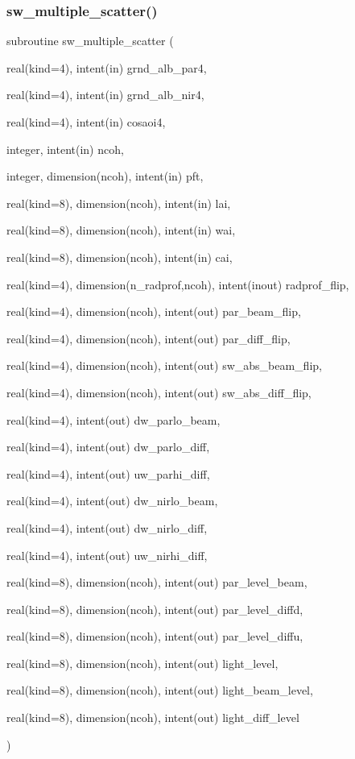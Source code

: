 \subsubsection{\texorpdfstring{sw\+\_\+multiple\+\_\+scatter()}{sw\_multiple\_scatter()}}
{\footnotesize\ttfamily subroutine sw\+\_\+multiple\+\_\+scatter (\begin{DoxyParamCaption}\item[{real(kind=4), intent(in)}]{grnd\+\_\+alb\+\_\+par4,  }\item[{real(kind=4), intent(in)}]{grnd\+\_\+alb\+\_\+nir4,  }\item[{real(kind=4), intent(in)}]{cosaoi4,  }\item[{integer, intent(in)}]{ncoh,  }\item[{integer, dimension(ncoh), intent(in)}]{pft,  }\item[{real(kind=8), dimension(ncoh), intent(in)}]{lai,  }\item[{real(kind=8), dimension(ncoh), intent(in)}]{wai,  }\item[{real(kind=8), dimension(ncoh), intent(in)}]{cai,  }\item[{real(kind=4), dimension(n\+\_\+radprof,ncoh), intent(inout)}]{radprof\+\_\+flip,  }\item[{real(kind=4), dimension(ncoh), intent(out)}]{par\+\_\+beam\+\_\+flip,  }\item[{real(kind=4), dimension(ncoh), intent(out)}]{par\+\_\+diff\+\_\+flip,  }\item[{real(kind=4), dimension(ncoh), intent(out)}]{sw\+\_\+abs\+\_\+beam\+\_\+flip,  }\item[{real(kind=4), dimension(ncoh), intent(out)}]{sw\+\_\+abs\+\_\+diff\+\_\+flip,  }\item[{real(kind=4), intent(out)}]{dw\+\_\+parlo\+\_\+beam,  }\item[{real(kind=4), intent(out)}]{dw\+\_\+parlo\+\_\+diff,  }\item[{real(kind=4), intent(out)}]{uw\+\_\+parhi\+\_\+diff,  }\item[{real(kind=4), intent(out)}]{dw\+\_\+nirlo\+\_\+beam,  }\item[{real(kind=4), intent(out)}]{dw\+\_\+nirlo\+\_\+diff,  }\item[{real(kind=4), intent(out)}]{uw\+\_\+nirhi\+\_\+diff,  }\item[{real(kind=8), dimension(ncoh), intent(out)}]{par\+\_\+level\+\_\+beam,  }\item[{real(kind=8), dimension(ncoh), intent(out)}]{par\+\_\+level\+\_\+diffd,  }\item[{real(kind=8), dimension(ncoh), intent(out)}]{par\+\_\+level\+\_\+diffu,  }\item[{real(kind=8), dimension(ncoh), intent(out)}]{light\+\_\+level,  }\item[{real(kind=8), dimension(ncoh), intent(out)}]{light\+\_\+beam\+\_\+level,  }\item[{real(kind=8), dimension(ncoh), intent(out)}]{light\+\_\+diff\+\_\+level }\end{DoxyParamCaption})}

